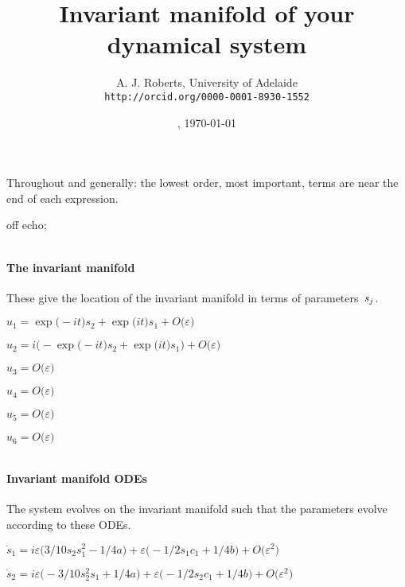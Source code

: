 \documentclass[11pt,a5paper]{article}
\title{Invariant manifold of your dynamical system}
\author{A. J. Roberts, University of Adelaide\\
\texttt{http://orcid.org/0000-0001-8930-1552}}
\date{\now, \today}
\def\eps{\varepsilon} \def\_{_}
\begin{document}
\maketitle
Throughout and generally: the lowest order, most
important, terms are near the end of each expression.


off echo;


\(
\)
\paragraph{The invariant manifold}
These give the location of the invariant manifold in
terms of parameters~\(s\sb j\).
\(
\)\par

\(u_{1}=\exp \big(-i t\big) s_{2}+\exp \big(i t\big) s_{1}+O\big(
\varepsilon \big)
\)\par

\(u_{2}=i \big(-\exp \big(-i t\big) s_{2}+\exp \big(i t\big) s_{1}\big)+O
\big(\varepsilon \big)
\)\par

\(u_{3}=O\big(\varepsilon \big)
\)\par

\(u_{4}=O\big(\varepsilon \big)
\)\par

\(u_{5}=O\big(\varepsilon \big)
\)\par

\(u_{6}=O\big(\varepsilon \big)
\)\par

\(
\)
\paragraph{Invariant manifold ODEs}
The system evolves on the invariant manifold such
that the parameters evolve according to these ODEs.
\(
\)\par

\(\dot s_{1}=i \eps \big(3/10 s_{2} s_{1}^{2}-1/4 a\big)+\eps \big(-1/2 s_
{1} c\_1+1/4 b\big)+O\big(\varepsilon ^{2}\big)
\)\par

\(\dot s_{2}=i \eps \big(-3/10 s_{2}^{2} s_{1}+1/4 a\big)+\eps \big(-1/2 s
_{2} c\_1+1/4 b\big)+O\big(\varepsilon ^{2}\big)
\)\par

\(
\)\par
\end{document}
